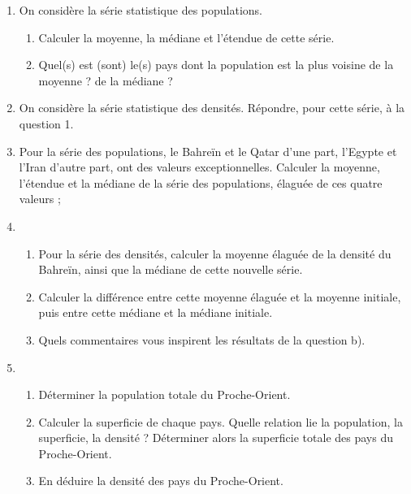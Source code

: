 \begin{enumerate}
\item On considère la série statistique des populations.
\begin{enumerate}
\item  Calculer la moyenne, la médiane et l’étendue de cette série.
\item Quel(s) est (sont) le(s) pays dont la population est la plus voisine de la moyenne ? de la médiane ?
\end{enumerate}
\item  On considère la série statistique des densités.
Répondre, pour cette série, à la question 1.
\item  Pour la série des populations, le Bahreïn et le Qatar d’une part, l’Egypte et l’Iran d’autre part, ont des valeurs exceptionnelles. Calculer la moyenne, l’étendue et la médiane de la série des populations, élaguée de ces quatre valeurs ;
\item \begin{enumerate}
\item  Pour la série des densités, calculer la moyenne élaguée de la densité du Bahreïn, ainsi que la médiane de cette nouvelle série.
\item  Calculer la différence entre cette moyenne élaguée et la moyenne initiale, puis entre cette médiane et la médiane initiale.
\item Quels commentaires vous inspirent les résultats de la question b).
\end{enumerate}
\item 
\begin{enumerate}
\item  Déterminer la population totale du Proche-Orient.
\item  Calculer la superficie de chaque pays. Quelle relation lie la population, la superficie, la densité ?
Déterminer alors la superficie totale des pays du Proche-Orient.
\item  En déduire la densité des pays du Proche-Orient.
\end{enumerate}
\end{enumerate}